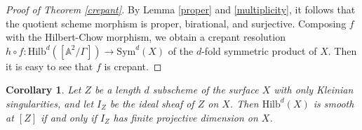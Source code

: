 \documentclass{amsart}[12pt]
\newtheorem{cor}[theorem]{Corollary}
\theoremstyle{definition}
\theoremstyle{remark}
\numberwithin{equation}{section}
\begin{document}
\begin{proof}[Proof of Theorem \ref{crepant}]
By Lemma \ref{proper} and \ref{multiplicity}, it follows that the quotient scheme morphism is proper, birational, and surjective. Composing $f$ with the Hilbert-Chow morphism, we obtain a crepant resolution $h \circ f: \mathrm{Hilb}^d([\mathbb{A}^2/\Gamma]) \to \mathrm{Sym}^d(X)$ of the $d$-fold symmetric product of $X$. Then it is easy to see that $f$ is crepant. 
\end{proof}

\begin{cor}\label{singularloci}
Let $Z$ be a length $d$ subscheme of the surface $X$ with only Kleinian singularities, and let $I_Z$ be the ideal sheaf of $Z$ on $X$. Then $\mathrm{Hilb}^d(X)$ is smooth at $[Z]$ if and only if $I_Z$ has finite projective dimension on $X$.
\end{cor}
\end{document}
